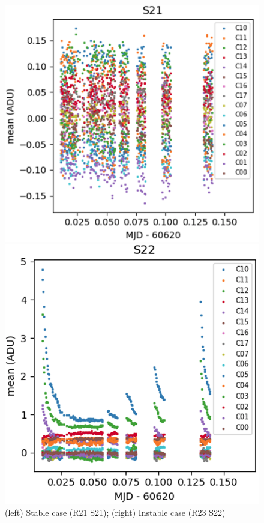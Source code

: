 \begin{figure}[h]
\centering
\begin{minipage}[b]{0.45\textwidth}
\centering
\includegraphics[width=\textwidth]{sections/figures/E2136_R21_S21.png}
\end{minipage}
\hfill
\begin{minipage}[b]{0.45\textwidth}
\centering
\includegraphics[width=\textwidth]{sections/figures/E2136_R23_S22.png}
\end{minipage}
\caption{(left) Stable case (R21 S21); (right) Instable case (R23 S22)}
\end{figure}


